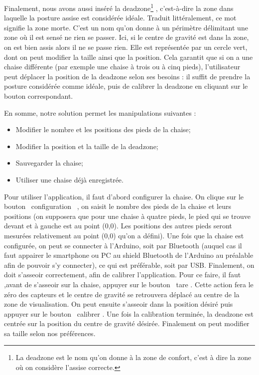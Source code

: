 \documentclass{polytech/polytech}
\begin{document}
Finalement, nous avons aussi inséré la \guillemotleft  deadzone\footnote{La deadzone est le nom qu'on donne à la zone de confort, c'est à dire la zone où on considère l'assise correcte.} \guillemotright, c'est-à-dire la zone dans laquelle la posture assise est considérée idéale. Traduit littéralement, ce mot signifie la zone morte. C'est un nom qu'on donne à un périmètre délimitant une zone où il est sensé ne rien se passer. Ici, si le centre de gravité est dans la zone, on est bien assis alors il ne se passe rien. Elle est représentée par un cercle vert, dont on peut modifier la taille ainsi que la position. Cela garantit que si on a une chaise différente (par exemple une chaise à trois ou à cinq pieds), l'utilisateur peut déplacer la position de la deadzone selon ses besoins : il suffit de prendre la posture considérée comme idéale, puis de calibrer la deadzone en cliquant sur le bouton correspondant.

En somme, notre solution permet les manipulations suivantes :
\begin{itemize}
\item Modifier le nombre et les positions des pieds de la chaise;
\item Modifier la position et la taille de la deadzone;
\item Sauvegarder la chaise;
\item Utiliser une chaise déjà enregistrée.
\end{itemize}


Pour utiliser l'application, il faut d'abord configurer la chaise. On clique sur le bouton \guillemotleft\ configuration \guillemotright\ , on saisit le nombre des pieds de la chaise et leurs positions (on supposera que pour une chaise à quatre pieds, le pied qui se trouve devant et à gauche est au point (0,0). Les positions des autres pieds seront mesurées relativement au point (0,0) qu'on a défini).
 Une fois que la chaise est configurée, on peut se connecter à l'Arduino, soit par Bluetooth (auquel cas il faut appairer le smartphone ou PC au shield Bluetooth de l'Arduino au préalable afin de pouvoir s'y connecter), ce qui est préférable, soit par USB. 
Finalement, on doit s'asseoir correctement, afin de calibrer l'application.
Pour ce faire, il faut ,avant de s'asseoir sur la chaise, appuyer sur le bouton \guillemotleft\ tare \guillemotright . Cette action fera le zéro des capteurs et le centre de gravité se retrouvera déplacé au centre de la zone de visualisation. On peut ensuite s'asseoir dans la position désiré puis appuyer sur le bouton \guillemotleft\ calibrer \guillemotright . Une fois la calibration terminée, la deadzone est centrée sur la position du centre de gravité désirée. Finalement on peut modifier sa taille selon nos préférences. 
\end{document}
